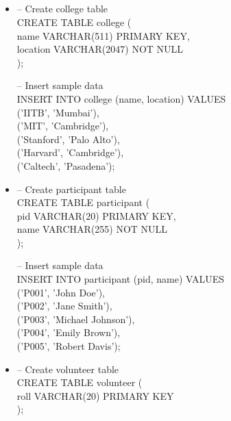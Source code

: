 \documentclass[7pt]{article}
\begin{document}
\subsection{}

\begin{itemize}
    \item -- Create college table   \\
CREATE TABLE college (              \\
    name VARCHAR(511) PRIMARY KEY,  \\
    location VARCHAR(2047) NOT NULL \\
);  \vspace{2pt}

-- Insert sample data               \\
INSERT INTO college (name, location) VALUES     \\
    ('IITB', 'Mumbai'), \\
    ('MIT', 'Cambridge'),   \\
    ('Stanford', 'Palo Alto'),  \\
    ('Harvard', 'Cambridge'),   \\
    ('Caltech', 'Pasadena');

    \item -- Create participant table   \\
    CREATE TABLE participant (      \\
        pid VARCHAR(20) PRIMARY KEY,    \\
        name VARCHAR(255) NOT NULL  \\
    );  \vspace{2pt}
    
    -- Insert sample data   \\
    INSERT INTO participant (pid, name) VALUES  \\
        ('P001', 'John Doe'),   \\
        ('P002', 'Jane Smith'), \\
        ('P003', 'Michael Johnson'),    \\
        ('P004', 'Emily Brown'),    \\
        ('P005', 'Robert Davis');

    \item -- Create volunteer table \\
    CREATE TABLE volunteer (    \\
        roll VARCHAR(20) PRIMARY KEY    \\
    );  \vspace{2pt}
    

\end{itemize}
\end{document}
